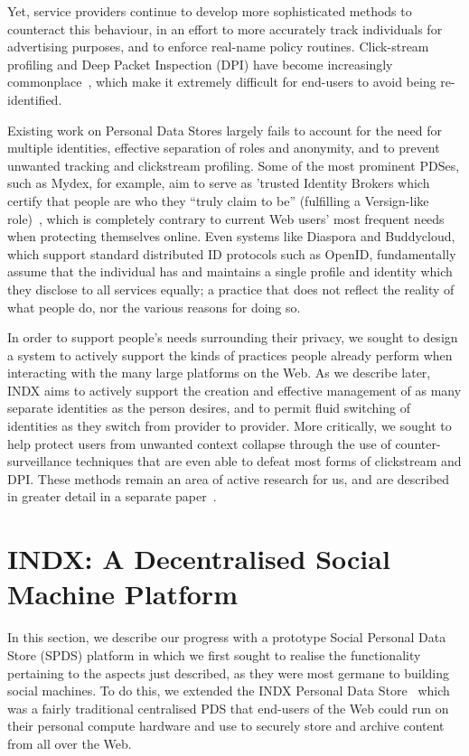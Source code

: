 \documentclass{sig-alternate}
\begin{document}
Yet, service providers continue to develop more sophisticated methods to counteract this behaviour, in an effort to more accurately track individuals for advertising purposes, and to enforce real-name policy routines.  Click-stream profiling and Deep Packet Inspection (DPI) have become increasingly commonplace~\cite{collins2009privacy}, which make it extremely difficult for end-users to avoid being re-identified. 

Existing work on Personal Data Stores largely fails to account for the need for multiple identities, effective separation of roles and anonymity, and to prevent unwanted tracking and clickstream profiling.  Some of the most prominent PDSes, such as Mydex, for example, aim to serve as 'trusted Identity Brokers which certify that people are who they ``truly claim to be'' (fulfilling a Versign-like role)~\cite{heath2013digital}, which is completely contrary to current Web users'  most frequent needs when protecting themselves online.  Even systems like Diaspora and Buddycloud, which support standard distributed ID protocols such as OpenID, fundamentally assume that the individual has and maintains a single profile and identity which they disclose to all services equally; a practice that does not reflect the reality of what people do, nor the various reasons for doing so.

In order to support people's needs surrounding their privacy, we sought to design a system to actively support the kinds of practices people already perform when interacting with the many large platforms on the Web.  As we describe later, INDX aims to actively support the creation and effective management of as many separate identities as the person desires, and to permit fluid switching of identities as they switch from provider to provider.  More critically, we sought to help protect users from unwanted context collapse through the use of counter-surveillance techniques that are even able to defeat most forms of clickstream and DPI.  These methods remain an area of active research for us, and are described in greater detail in a separate paper~\cite{murray2014social}.


\section{INDX: A Decentralised Social Machine Platform}

In this section, we describe our progress with a prototype Social Personal Data Store (SPDS) platform
in which we first sought to realise the functionality pertaining to the aspects just described, as they
were most germane to building social machines.  To do this, we extended the INDX Personal Data Store~\cite{van2012decentralized}
which was a fairly traditional centralised PDS that end-users of the Web could run on their personal compute
hardware and use to securely store and archive content from all over the Web.  
\end{document}
